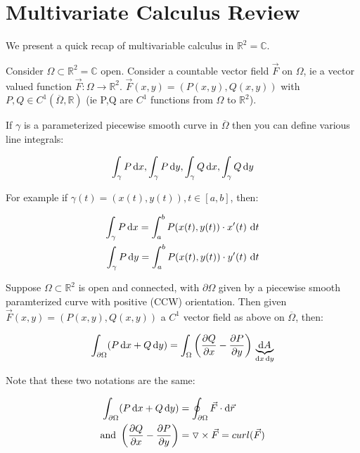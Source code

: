 \section{Multivariate Calculus Review}


We present a quick recap of multivariable calculus in $\mathbb{R}^2 = \mathbb{C}$.

Consider $\Omega \subset \mathbb{R}^2 = \mathbb{C}$ open. Consider a countable vector field $\Vec{F}$ on $\Omega$, ie a vector valued function $\Vec{F}:\Omega \rightarrow \mathbb{R}^2$. $\Vec{F}(x,y) = (P(x,y),Q(x,y))$ with $P,Q \in C^1(\overline{\Omega},\mathbb{R})$ (ie P,Q are $C^1$ functions from $\Omega$ to $\mathbb{R}^2$).

If $\gamma$ is a parameterized piecewise smooth curve in $\overline{\Omega}$ then you can define various line integrals:

\begin{align*}
    \int_\gamma P  \dif x , \int_\gamma P  \dif y,\int_\gamma Q  \dif x , \int_\gamma Q  \dif y
\end{align*}

For example if $\gamma(t) = (x(t),y(t)), t\in[a,b]$, then:

\begin{align*}
    \int_\gamma P  \dif x = \int_a^b P(x(t),y(t))\cdot x'(t) \,  \dif t\\
    \int_\gamma P  \dif y = \int_a^b P(x(t),y(t))\cdot y'(t) \,  \dif t\\
\end{align*}


\begin{theorem}
Suppose $\Omega \subset \mathbb{R}^2$ is open and connected, with $\partial \Omega$ given by a piecewise smooth paramterized curve with positive (CCW) orientation. Then given $\Vec{F}(x,y) = (P(x,y),Q(x,y))$ a $C^1$ vector field as above on $\overline{\Omega}$, then:

\begin{align*}
    \int_{\partial \Omega} (P \dif x + Q \dif y) = \int_\Omega \left( \frac{\partial Q}{\partial x} - \frac{\partial P}{\partial y}  \right) \, \underbrace{ \dif A}_{ \dif x \dif y}
\end{align*}
\end{theorem}

\begin{note}
Note that these two notations are the same:

\begin{align*}
    \int_{\partial \Omega} (P \dif x + Q \dif y) &= \oint_{\partial \Omega}\Vec{F}\cdot  \dif \Vec{r}\\
    \text{and } \left( \frac{\partial Q}{\partial x} - \frac{\partial P}{\partial y}  \right) &= \triangledown \times \Vec{F} = curl(\Vec{F})
\end{align*}
\end{note}